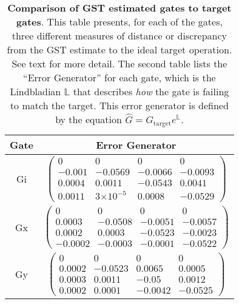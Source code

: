 \documentclass{article}[11pt]
\providecommand{\e}[1]{\ensuremath{\times 10^{#1}}}
\begin{document}
\begin{table}[h]
\begin{center}
\vspace{2em}
\begin{tabular}[l]{|c|c|}
\hline
Gate & Error Generator \\ \hline
Gi & $ \left(\!\!\begin{array}{cccc}
0 & 0 & 0 & 0 \\ 
-0.001 & -0.0569 & -0.0066 & -0.0093 \\ 
0.0004 & 0.0011 & -0.0543 & 0.0041 \\ 
0.0011 & 3\e{-5} & 0.0008 & -0.0529
 \end{array}\!\!\right) $
 \\ \hline
Gx & $ \left(\!\!\begin{array}{cccc}
0 & 0 & 0 & 0 \\ 
0.0003 & -0.0508 & -0.0051 & -0.0057 \\ 
0.0002 & 0.0003 & -0.0523 & -0.0023 \\ 
-0.0002 & -0.0003 & -0.0001 & -0.0522
 \end{array}\!\!\right) $
 \\ \hline
Gy & $ \left(\!\!\begin{array}{cccc}
0 & 0 & 0 & 0 \\ 
0.0002 & -0.0523 & 0.0065 & 0.0005 \\ 
0.0003 & 0.0011 & -0.05 & 0.0012 \\ 
0.0002 & 0.0001 & -0.0042 & -0.0525
 \end{array}\!\!\right) $
 \\ \hline
\end{tabular}

\caption{\textbf{Comparison of GST estimated gates to target gates}.  This table presents, for each of the gates, three different measures of distance or discrepancy from the GST estimate to the ideal target operation.  See text for more detail.  The second table lists the ``Error Generator'' for each gate, which is the Lindbladian $\mathbb{L}$ that describes \emph{how} the gate is failing to match the target.  This error generator is defined by the equation $\hat{G} = G_{\mathrm{target}}e^{\mathbb{L}}$. \label{bestGatesetVsTargetTable}}
\end{center}
\end{table}
\end{document}
